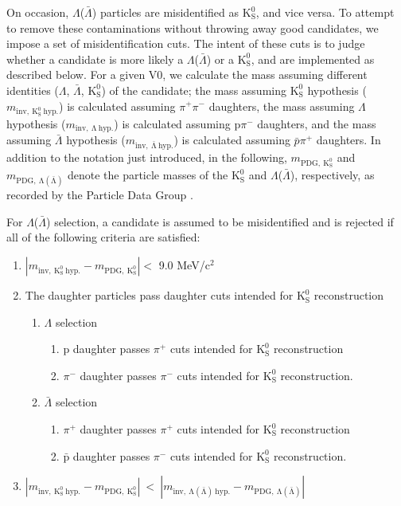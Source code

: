 \documentclass[ALICE,manyauthors]{cernphprep}
\newcommand{\Lam}{$\Lambda$\xspace}
\newcommand{\ALam}{$\bar{\Lambda}$\xspace}
\newcommand{\LamALam}{$\Lambda$($\bar{\Lambda}$)\xspace}
\newcommand{\Ks}{$\mathrm{K^{0}_{S}}$\xspace}
\begin{document}
On occasion, \LamALam particles are misidentified as \Ks, and vice versa.  
To attempt to remove these contaminations without throwing away good candidates, we impose a set of misidentification cuts.  
The intent of these cuts is to judge whether a candidate is more likely a \LamALam or a \Ks, and are implemented as described below.  
For a given V0, we calculate the mass assuming different identities (\Lam, \ALam, \Ks) of the candidate; the mass assuming \Ks hypothesis ($m_{\mathrm{inv,~ K^{0}_{S}~ hyp.}}$) is calculated assuming $\pi^{+}\pi^{-}$ daughters, the mass assuming \Lam hypothesis ($m_{\mathrm{inv,~ \Lambda~ hyp.}}$) is calculated assuming p$\pi^{-}$ daughters, and the mass assuming \ALam hypothesis ($m_{\mathrm{inv,~ \bar{\Lambda}~ hyp.}}$) is calculated assuming $\bar{p}\pi^{+}$ daughters.  
In addition to the notation just introduced, in the following, $m_{\mathrm{PDG,~ K^{0}_{S}}}$ and $m_{\mathrm{PDG,~ \Lambda(\bar{\Lambda})}}$ denote the particle masses of the \Ks and \LamALam, respectively, as recorded by the Particle Data Group \cite{Patrignani:2016xqp}.

For \LamALam selection, a candidate is assumed to be misidentified and is rejected if all of the following criteria are satisfied:

\begin{enumerate}
 \item $\left|m_{\mathrm{inv,~ K^{0}_{S}~ hyp.}} - m_{\mathrm{PDG,~ K^{0}_{S}}}\right| < $ 9.0 MeV/c$^{2}$
 \item The daughter particles pass daughter cuts intended for \Ks reconstruction
 \begin{enumerate}
  \item \Lam selection
  \begin{enumerate}
   \item p daughter passes $\pi^{+}$ cuts intended for \Ks reconstruction
   \item $\pi^{-}$ daughter passes $\pi^{-}$ cuts intended for \Ks reconstruction.
  \end{enumerate}
  \item \ALam selection
  \begin{enumerate}
   \item $\pi^{+}$ daughter passes $\pi^{+}$ cuts intended for \Ks reconstruction
   \item $\bar{\mathrm{p}}$ daughter passes $\pi^{-}$ cuts intended for \Ks reconstruction.
  \end{enumerate}  
 \end{enumerate}
 \item $\left|m_{\mathrm{inv,~ K^{0}_{S}~ hyp.}} - m_{\mathrm{PDG,~ K^{0}_{S}}}\right|~ < ~\left|m_{\mathrm{inv,~ \Lambda(\bar{\Lambda})~ hyp.}} - m_{\mathrm{PDG,~ \Lambda(\bar{\Lambda})}}\right|$
\end{enumerate} 
\end{document}
